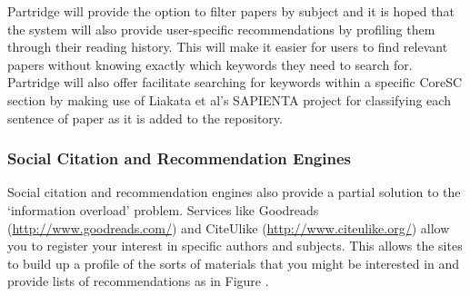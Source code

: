 \documentclass[12pt,a4paper]{article}
\begin{document}
Partridge will provide the option to filter papers by subject and it is hoped
that the system will also provide user-specific recommendations by profiling
them through their reading history. This will make it easier for users to find
relevant papers without knowing exactly which keywords they need to search for.
Partridge will also offer facilitate searching for keywords within a specific
CoreSC section by making use of Liakata et al's SAPIENTA project for
classifying each sentence of paper as it is added to the repository.

\subsubsection{Social Citation and Recommendation Engines}
Social citation and recommendation engines also provide a partial solution to
the `information overload' problem.  Services like Goodreads
(\url{http://www.goodreads.com/}) and CiteUlike
(\url{http://www.citeulike.org/}) allow you to register your interest in
specific authors and subjects. This allows the sites to build up a profile of
the sorts of materials that you might be interested in and provide lists of
recommendations as in Figure \cite{social_indexes}.
\end{document}
